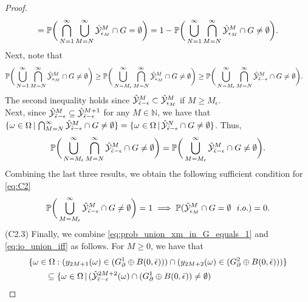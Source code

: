 \documentclass[12pt]{l4dc2022} %
\begin{document}
\begin{proof}
\begin{align}
=
\mathbb{P}\bigg(\bigcap_{N=1}^\infty\bigcup_{M=N}^\infty \hat{\mathcal{Y}}^M_{\epsilon_M}\cap G = \emptyset\bigg)
\nonumber
=
1 - \mathbb{P}\bigg(\bigcup_{N=1}^\infty\bigcap_{M=N}^\infty \hat{\mathcal{Y}}^M_{\epsilon_M}\cap G \neq \emptyset\bigg).
\end{align}
Next, note that 
\begin{align*}
\Prob\bigg(\bigcup_{N=1}^\infty\bigcap_{M=N}^\infty \hat\Y^M_{\epsilon_M}\cap G \neq \emptyset\bigg)
&\geq 
\Prob\bigg(\bigcup_{N=M_\epsilon}^\infty\bigcap_{M=N}^\infty \hat\Y^M_{\epsilon_M}\cap G\neq \emptyset\bigg)
% 
% 
\geq 
\Prob\bigg(
\bigcup_{N=M_\epsilon}^\infty
\bigcap_{M=N}^\infty
\hat\Y^M_{\bar{\epsilon}-\epsilon}\cap G \neq \emptyset\bigg).
\end{align*}
The second inequality holds since $\hat{\mathcal{Y}}^M_{\bar{\epsilon}-\epsilon}\subset \hat{\mathcal{Y}}^M_{\epsilon_M}$ if $M\geq M_\epsilon$. %
\\
Next, 
since $\hat{\mathcal{Y}}^M_{\bar{\epsilon}-\epsilon}\subseteq\hat{\mathcal{Y}}^{M+1}_{\bar{\epsilon}-\epsilon}$ for any $M\in\mathbb{N}$, we have that 
$\{\omega\in\Omega\, |\, \bigcap_{M=N}^\infty \hat{\mathcal{Y}}^M_{\bar{\epsilon}-\epsilon}\cap G \neq \emptyset\}
=
\{\omega\in\Omega \, |\, \hat{\mathcal{Y}}^N_{\bar{\epsilon}-\epsilon}\cap G \neq \emptyset\}$. Thus, 
\begin{equation}\nonumber
\mathbb{P}\bigg(\bigcup_{N=M_{\epsilon}}^\infty\bigcap_{M=N}^\infty \hat{\mathcal{Y}}^M_{\bar{\epsilon}-\epsilon}\cap G \neq \emptyset\bigg)=\mathbb{P}\bigg(\bigcup_{M=M_\epsilon}^\infty\hat{\mathcal{Y}}^M_{\bar{\epsilon}-\epsilon}\cap G \neq \emptyset\bigg).
\end{equation}
Combining the last three results, we obtain the following sufficient condition for \eqref{eq:C2}
\begin{equation}\label{eq:io_union_iff}
\mathbb{P}\bigg(\bigcup_{M=M_\epsilon}^\infty\hat{\mathcal{Y}}^M_{\bar{\epsilon}-\epsilon}\cap G \neq \emptyset\bigg) = 1
	\implies
	\mathbb{P}(\hat{\mathcal{Y}}^M_{\epsilon_M}\cap G = \emptyset \ \ i.o.) = 0 
.
\end{equation}
% 
% 
% 
(C2.3) 
Finally, we combine \eqref{eq:prob_union_xm_in_G_equals_1} and \eqref{eq:io_union_iff} as follows. 
% 
% 
% 
% 
% 
% 
% 
% 
% 
% 
% 
% 
% 
% 
% 
% 
% 
% 
% 
% 
% 
% 
For $M\geq 0$, we have that
\begin{align*}
&\{
\omega\in\Omega: 
(y_{2M+1}(\omega)\in (G_\partial^1\oplus B(0,\bar{\epsilon})))
\cap 
(y_{2M+2}(\omega)\in (G_\partial^2\oplus B(0,\bar{\epsilon})))
\}
\\
&\qquad\subseteq
\{\omega\in\Omega \,|\, 
(\hat\Y^{2M+2}_{\bar{\epsilon}-\epsilon}(\omega)\cap (G_\partial^1\oplus B(0,\bar{\epsilon}))\neq\emptyset)

\end{align*}
\end{proof}
\end{document}
